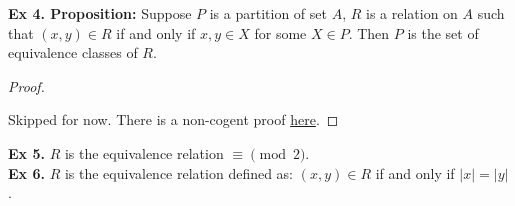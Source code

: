 \documentclass{article}
\begin{document}
\newpage

\noindent \textbf{Ex 4. Proposition:} Suppose $P$ is a partition of set $A$, $R$ is a relation on $A$ such that $(x, y) \in R$ if and only if $x, y \in X$ for some $X \in P$. Then $P$ is the set of equivalence classes of $R$.

\begin{proof}
$ $\newline

\noindent Skipped for now. There is a non-cogent proof \href{https://www.slader.com/textbook/9780989472111-book-of-proof-2nd-edition/188/exercises/4/}{here}.

\end{proof}

\noindent \textbf{Ex 5.} $R$ is the equivalence relation $\equiv \pmod{2}$.\\

\noindent \textbf{Ex 6.} $R$ is the equivalence relation defined as: $(x, y) \in R$ if and only if $|x|=|y|$.\\
\end{document}
